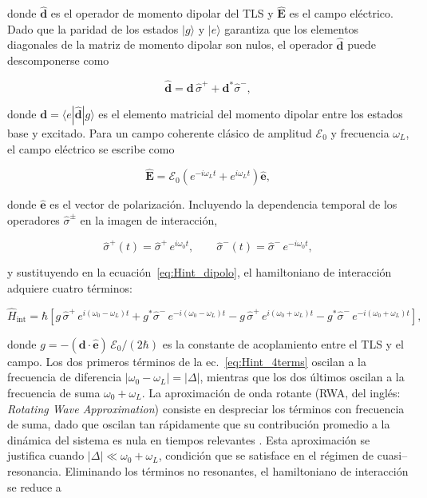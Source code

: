 donde $\hat{\mathbf{d}}$ es el operador de momento dipolar del TLS y $\hat{\mathbf{E}}$ es el campo eléctrico. Dado que la paridad de los estados $|g\rangle$ y $|e\rangle$ garantiza que los elementos diagonales de la matriz de momento dipolar son nulos, el operador $\hat{\mathbf{d}}$ puede descomponerse como

\begin{equation}
	\hat{\mathbf{d}} = \mathbf{d}\,\hat{\sigma}^+ + \mathbf{d}^*\hat{\sigma}^-,
\end{equation}

donde $\mathbf{d} = \langle e|\hat{\mathbf{d}}|g\rangle$ es el elemento matricial del momento dipolar entre los estados base y excitado. Para un campo coherente clásico de amplitud $\mathcal{E}_0$ y frecuencia $\omega_L$, el campo eléctrico se escribe como

\begin{equation}
	\hat{\mathbf{E}} = \mathcal{E}_0\left(e^{-i\omega_L t} +
	e^{i\omega_L t}\right)\hat{\mathbf{e}},
\end{equation}

donde $\hat{\mathbf{e}}$ es el vector de polarización. Incluyendo la dependencia temporal de los operadores $\hat{\sigma}^\pm$ en la imagen de interacción,

\begin{equation}
	\hat{\sigma}^+(t) = \hat{\sigma}^+\,e^{i\omega_0 t}, \qquad
	\hat{\sigma}^-(t) = \hat{\sigma}^-\,e^{-i\omega_0 t},
\end{equation}

y sustituyendo en la ecuación~\eqref{eq:Hint_dipolo}, el hamiltoniano de interacción adquiere cuatro términos:

\begin{equation}
	\hat{H}_\text{int} = \hbar\left[
	g\,\hat{\sigma}^+\,e^{i(\omega_0-\omega_L)t} +
	g^*\hat{\sigma}^-\,e^{-i(\omega_0-\omega_L)t} -
	g\,\hat{\sigma}^+\,e^{i(\omega_0+\omega_L)t} -
	g^*\hat{\sigma}^-\,e^{-i(\omega_0+\omega_L)t}
	\right],
	\label{eq:Hint_4terms}
\end{equation}

donde $g = -(\mathbf{d}\cdot\hat{\mathbf{e}})\,\mathcal{E}_0/(2\hbar)$ es la constante de acoplamiento entre el TLS y el campo. Los dos primeros términos de la ec.~\eqref{eq:Hint_4terms} oscilan a la frecuencia de diferencia $|\omega_0 - \omega_L| = |\Delta|$, mientras que los dos últimos oscilan a la frecuencia de suma $\omega_0 + \omega_L$. La aproximación de onda rotante (RWA, del inglés: \textit{Rotating Wave Approximation}) consiste en despreciar los términos con frecuencia de suma, dado que oscilan tan rápidamente que su contribución promedio a la dinámica del sistema es nula en tiempos relevantes \cite{gerry2005,steck2007}. Esta aproximación se justifica cuando $|\Delta| \ll \omega_0 + \omega_L$, condición que se satisface en el régimen de cuasi--resonancia. Eliminando los términos no resonantes, el hamiltoniano de interacción se reduce a

